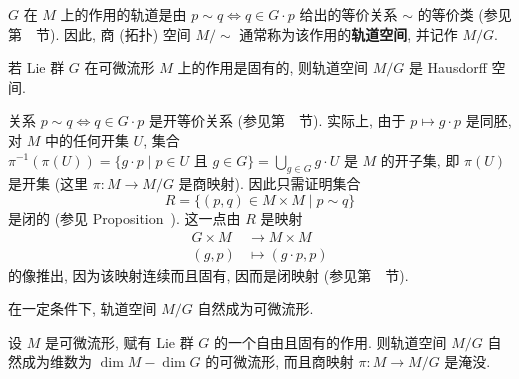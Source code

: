 $G$ 在 $M$ 上的作用的轨道是由 $p\sim q\Leftrightarrow q\in G\cdot p$ 给出的等价关系 $\sim$ 的等价类 (参见第~~节). 因此, 商 (拓扑) 空间 $M/{\sim}$ 通常称为该作用的\textbf{轨道空间}, 并记作 $M/G$.

\begin{RiemannProposition}\label{prop:hausdorff-orbit-space}
若 Lie 群 $G$ 在可微流形 $M$ 上的作用是固有的, 则轨道空间 $M/G$ 是 Hausdorff 空间.
\end{RiemannProposition}

\begin{RiemannProof}
关系 $p\sim q\Leftrightarrow q\in G\cdot p$ 是开等价关系 (参见第~~节). 实际上, 由于 $p\mapsto g\cdot p$ 是同胚, 对 $M$ 中的任何开集 $U$, 集合 $\pi^{-1}(\pi(U))=\{g\cdot p\mid p\in U\text{ 且 }g\in G\}=\bigcup_{g\in G}g\cdot U$ 是 $M$ 的开子集, 即 $\pi(U)$ 是开集 (这里 $\pi:M\to M/G$ 是商映射). 因此只需证明集合
\[
  R=\{(p,q)\in M\times M\mid p\sim q\}
\]
是闭的 (参见 Proposition~). 这一点由 $R$ 是映射
\begin{align*}
  G\times M&\to M\times M\\
  (g,p)&\mapsto(g\cdot p,p)
\end{align*}
的像推出, 因为该映射连续而且固有, 因而是闭映射 (参见第~~节).
\end{RiemannProof}

在一定条件下, 轨道空间 $M/G$ 自然成为可微流形.

\begin{RiemannTheorem}\label{thm:quotient-manifold-of-free-proper-action}
设 $M$ 是可微流形, 赋有 Lie 群 $G$ 的一个自由且固有的作用. 则轨道空间 $M/G$ 自然成为维数为 $\dim M-\dim G$ 的可微流形, 而且商映射 $\pi:M\to M/G$ 是淹没.
\end{RiemannTheorem}

